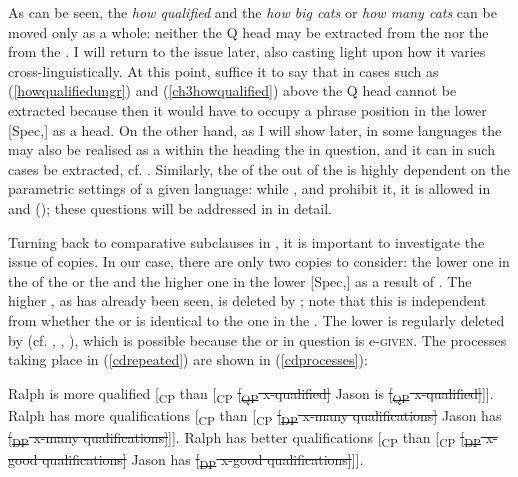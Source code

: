 \ea \label{howpatterns3}
 \label{howqualifiedungr}
 \label{ch3howqualified}
\z
\z

As can be seen, the  \textit{how qualified} and the  \textit{how big cats} or \textit{how many cats} can be moved only as a whole: neither the Q head may be extracted from the  nor the  from the . I will return to the issue later, also casting light upon how it varies cross-linguistically. At this point, suffice it to say that in cases such as (\ref{howqualifiedungr}) and (\ref{ch3howqualified}) above the Q head cannot be extracted because then it would have to occupy a phrase position in the lower [Spec,] as a head. On the other hand, as I will show later, in some languages the  may also be realised as a   within the  heading the  in question, and it can in such cases be extracted, cf. \citet{kantor2008}. Similarly, the  of the  out of the  is highly dependent on the parametric settings of a given language: while ,  and  prohibit it, it is allowed in  and  (\citealt{kennedymerchant2000}); these questions will be addressed in in detail.

Turning back to comparative subclauses in , it is important to investigate the issue of copies. In our case, there are only two copies to consider: the lower one in the  of the  or the  and the higher one in the lower [Spec,] as a result of . The higher , as has already been seen, is deleted by ; note that this is independent from whether the  or  is identical to the one in the . The lower  is regularly deleted by  (cf. \citealt{bobaljik2002}, \citealt{chomsky2008}, \citealt[44--48]{boskovicnunes2007}), which is possible because the  or  in question is e-\textsc{given}. The  processes taking place in (\ref{cdrepeated}) are shown in (\ref{cdprocesses}):

\ea \label{cdprocesses}
\ea	Ralph is more qualified [\textsubscript{CP} than [\textsubscript{CP} \sout{[\textsubscript{QP} x-qualified]} Jason is \sout{[\textsubscript{QP} x-qualified]}]]. \label{cdprocesspred}
\ex	Ralph has more qualifications [\textsubscript{CP} than [\textsubscript{CP} \sout{[\textsubscript{DP} x-many qualifications]} Jason has \sout{[\textsubscript{DP} x-many qualifications]}]].
\ex	Ralph has better qualifications [\textsubscript{CP} than [\textsubscript{CP} \sout{[\textsubscript{DP} x-good qualifications]} Jason has \sout{[\textsubscript{DP} x-good qualifications]}]].
\z
\z

